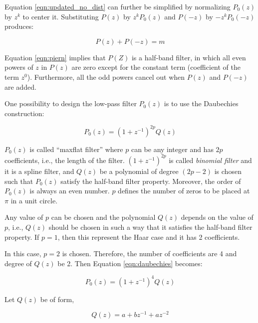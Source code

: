 Equation \ref{eqn:updated_no_dist} can further be simplified by normalizing $P_0(z)$ by $z^k$ to center it. Substituting $P(z)$ by $z^kP_0(z)$ and $P(-z)$ by $-z^kP_0(-z)$ produces:


 \begin{equation}\label{eqn:piern} 
 {P(z) + P(-z) =  m}
 \end{equation}
 
 Equation \ref{eqn:piern} implies that $P(Z)$ is a half-band filter, in which all even powers of $z$ in $P(z)$ are zero except for the constant term (coefficient of the term $z^0$). Furthermore, all the odd powers cancel out when $P(z)$ and $P(-z)$ are added. 
 
 
 One possibility to design the low-pass filter $P_0(z)$ is to use the Daubechies construction:
 
 \begin{equation}\label{eqn:daubechies} 
 {P_0(z) = (1 + z^{-1})^{2p}Q(z)}
 \end{equation}
 
$P_0(z)$ is called ``maxflat filter'' where $p$ can be any integer and has $2p$ coefficients, i.e., the length of the filter. $(1 + z^{-1})^{2p}$ is called \textit{binomial filter} and it is a spline filter, and $Q(z)$ be a polynomial of degree $(2p-2)$ is chosen such that $P_0(z)$ satisfy  the half-band filter property. Moreover, the order of $P_0(z)$ is always an even number. $p$ defines the number of zeros to be placed at $\pi$ in a unit circle. 

Any value of $p$ can be chosen and the polynomial $Q(z)$ depends on the value of $p$, i.e., $Q(z)$ should be chosen in such a way that it satisfies the half-band filter property. If $p=1$, then this represent the Haar case and it has 2 coefficients.

In this case, $p=2$ is chosen. Therefore, the number of coefficients are 4 and degree of $Q(z)$ be 2. Then Equation \ref{eqn:daubechies} becomes:

 \begin{equation}\label{eqn:daubechies_upd} 
{P_0(z) = (1 + z^{-1})^{4}Q(z)}
\end{equation}

Let $Q(z)$ be of form,

 \begin{equation}\label{eqn:qz} 
{Q(z) = a+bz^{-1}+az^{-2}}
\end{equation}


